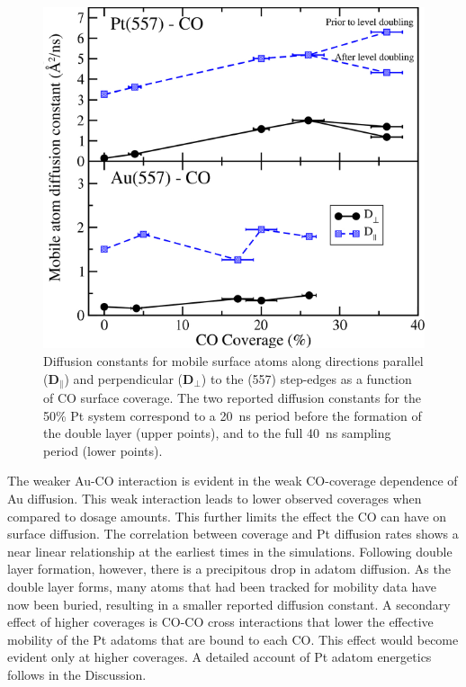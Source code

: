 \begin{figure}[p!]
\centering
\includegraphics[width=\linewidth]{../figures/chap2/diffusion.pdf}
\caption{Diffusion constants for mobile surface atoms along directions
  parallel ($\mathbf{D}_{\parallel}$) and perpendicular
  ($\mathbf{D}_{\perp}$) to the (557) step-edges as a function of CO
  surface coverage.  The two reported diffusion constants for the 50\%
  Pt system correspond to a 20~ns period before the formation of the
  double layer (upper points), and to the full 40~ns sampling period
  (lower points).}
\label{fig:diff}
\end{figure}

The weaker Au-CO interaction is evident in the weak CO-coverage 
dependence of Au diffusion. This weak interaction leads to lower 
observed coverages when compared to dosage amounts. This further 
limits the effect the CO can have on surface diffusion. The correlation 
between coverage and Pt diffusion rates shows a near linear relationship 
at the earliest times in the simulations. Following double layer formation, 
however, there is a precipitous drop in adatom diffusion. As the double 
layer forms, many atoms that had been tracked for mobility data have 
now been buried, resulting in a smaller reported diffusion constant. A
secondary effect of higher coverages is CO-CO cross interactions that
lower the effective mobility of the Pt adatoms that are bound to each CO.
This effect would become evident only at higher coverages. A detailed
account of Pt adatom energetics follows in the Discussion.
 
